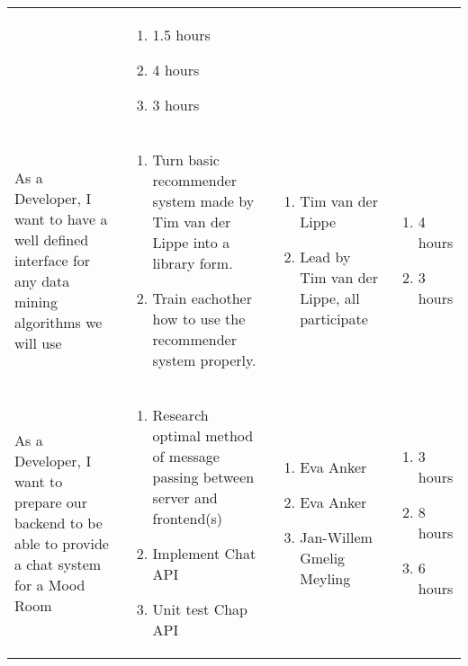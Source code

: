 \documentclass[11pt,a4paper]{article}
\begin{document}
\begin{table}[h]
\begin{tabular}{|p{4.5cm}|p{7cm}|p{4cm}|p{2cm}|}
& 
\begin{enumerate}
\item 1.5 hours
\item 4 hours
\item 3 hours
\end{enumerate} \\

As a Developer, I want to have a well defined interface for any data mining algorithms we will use & \begin{enumerate}
\item Turn basic recommender system made by Tim van der Lippe into a library form.
\item Train eachother how to use the recommender system properly.
\end{enumerate}

& 
\begin{enumerate}
\item Tim van der Lippe
\item Lead by Tim van der Lippe, all participate
\end{enumerate}

& 
\begin{enumerate}
\item 4 hours
\item 3 hours
\end{enumerate} \\

As a Developer, I want to prepare our backend to be able to provide a chat system for a Mood Room & \begin{enumerate}
\item Research optimal method of message passing between server and frontend(s)
\item Implement Chat API
\item Unit test Chap API
\end{enumerate}

& 
\begin{enumerate}
\item Eva Anker
\item Eva Anker
\item Jan-Willem Gmelig Meyling
\end{enumerate}

& 
\begin{enumerate}
\item 3 hours
\item 8 hours
\item 6 hours
\end{enumerate} \\
           
\end{tabular}
\end{table}
\end{document}
